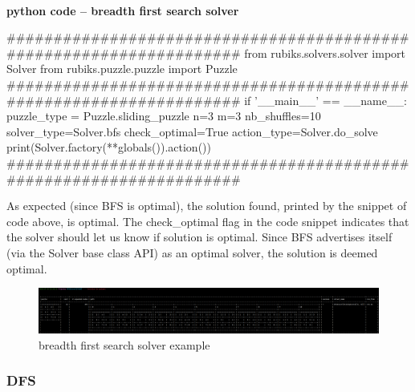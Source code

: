 \afblue
\paragraph{}{\textbf{python code -- breadth first search solver}}
\begin{python}
####################################################################
from rubiks.solvers.solver import Solver
from rubiks.puzzle.puzzle import Puzzle
####################################################################
if '__main__' == __name__:
    puzzle_type = Puzzle.sliding_puzzle
    n=3
    m=3
    nb_shuffles=10
    solver_type=Solver.bfs
    check_optimal=True
    action_type=Solver.do_solve
    print(Solver.factory(**globals()).action())
####################################################################
\end{python}
\black

As expected (since BFS is optimal), the solution found, printed by the snippet of code above, is optimal. The check\_optimal flag in the code snippet indicates that the solver should let us know if solution is optimal. Since BFS advertises itself (via the Solver base class API)  as an optimal solver, the solution is deemed optimal.


\begin{figure}[H]
\centering
\includegraphics[scale=0.25]{./Figures/examplebfssolver}
\caption[Examples]{breadth first search solver example}
\label{fig:examplebfssolver}
\end{figure}

\subsubsection{DFS}
\label{DFSSS}



\afblue
